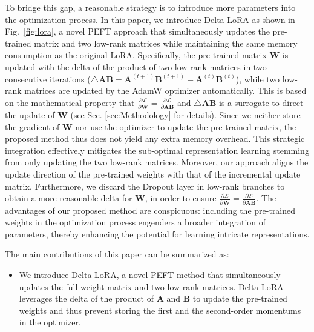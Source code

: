 {To bridge this gap, a reasonable strategy is to introduce more parameters into the optimization process. In this paper, we introduce Delta-LoRA as shown in Fig.~\ref{fig:lora}, a novel PEFT approach that simultaneously updates the pre-trained matrix and two low-rank matrices while maintaining the same memory consumption as the original LoRA. Specifically, the pre-trained matrix $\boldsymbol{W}$ is updated with the delta of the product of two low-rank matrices in two consecutive iterations ($\triangle \boldsymbol{A}\boldsymbol{B}=\boldsymbol{A}^{(t+1)}\boldsymbol{B}^{(t+1)} - \boldsymbol{A}^{(t)}\boldsymbol{B}^{(t)}$), while two low-rank matrices are updated by the AdamW optimizer automatically. This is based on the mathematical property that $\frac{\partial {\mathcal{L}}}{\partial \boldsymbol{W}} = \frac{\partial {\mathcal{L}}}{\partial \boldsymbol{A}\boldsymbol{B}}$ and $\triangle \boldsymbol{A}\boldsymbol{B}$ is a surrogate to direct the update of $\boldsymbol{W}$ (see Sec. \ref{sec:Methodology} for details). Since we neither store the gradient of $\boldsymbol{W}$ nor use the optimizer to update the pre-trained matrix, the proposed method thus does not yield any extra memory overhead. This strategic integration effectively mitigates the sub-optimal representation learning stemming from only updating the two low-rank matrices. Moreover, our approach aligns the update direction of the pre-trained weights with that of the incremental update matrix. Furthermore, we discard the Dropout layer in low-rank branches to obtain a more reasonable delta for $\boldsymbol{W}$, in order to ensure $\frac{\partial {\mathcal{L}}}{\partial \boldsymbol{W}} = \frac{\partial {\mathcal{L}}}{\partial \boldsymbol{A}\boldsymbol{B}}$.
The advantages of our proposed method are conspicuous: including the pre-trained weights in the optimization process engenders a broader integration of parameters, thereby enhancing the potential for learning intricate representations.

The main contributions of this paper can be summarized as:

\begin{itemize}[leftmargin=*]
    \item We introduce Delta-LoRA, a novel PEFT method that simultaneously updates the full weight matrix and two low-rank matrices. Delta-LoRA leverages the delta of the product of $\boldsymbol{A}$ and $\boldsymbol{B}$ to update the pre-trained weights and thus prevent storing the first and the second-order momentums in the optimizer.


\end{itemize}}
